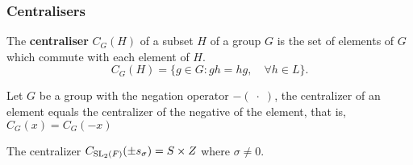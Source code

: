 
\subsubsection{Centralisers}

\begin{definition}[Centralizer]
\leanok
The \textbf{centraliser} $C_G(H)$ of a subset $H$ of a group $G$ is the set of elements of $G$ which commute with each element of $H$.
\begin{equation*} 
    C_G(H) = \{ g \in G  : gh=hg, \quad \forall h\in L \}. \end{equation*} 
\end{definition}

\begin{remark}
    \label{centralizer_neg_eq_centralizer}
    \leanok
     Let $G$ be a group with the negation operator $-(\; \cdot \;)$, the centralizer of an element equals the centralizer of the negative of the element, that is, $C_G(x) = C_G(-x)$
\end{remark}
    

    
    
    \begin{proposition}
    \label{centralizer_s_eq_SZ}
    \leanok
    The centralizer $C_{\operatorname{SL}_2(F)}(\pm s_\sigma) =  S \times Z $ where $\sigma \neq 0$.
    \end{proposition}
    
